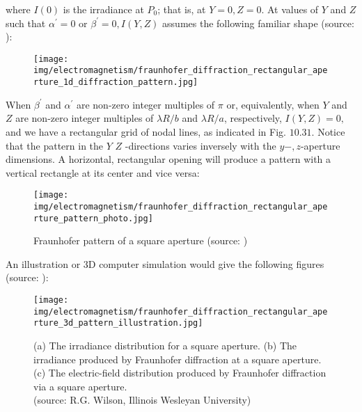 	where $I(0)$ is the irradiance at $P_{0}$; that is, at $Y=0, Z=0$. At values of $Y$ and $Z$ such that $\alpha^{\prime}=0$ or $\beta^{\prime}=0, I(Y, Z)$ assumes the following familiar shape (source: \cite{hecht2016optics}):
	\begin{figure}[H]
		\centering
		\texttt{[image: img/electromagnetism/fraunhofer\_diffraction\_rectangular\_aperture\_1d\_diffraction\_pattern.jpg]}
	\end{figure}
	When $\beta^{\prime}$ and $\alpha^{\prime}$ are non-zero integer multiples of $\pi$ or, equivalently, when $Y$ and $Z$ are non-zero integer multiples of $\lambda R / b$ and $\lambda R / a$, respectively, $I(Y, Z)=0,$ and we have a rectangular grid of nodal lines, as indicated in Fig. $10.31 .$ Notice that the pattern in the $Y$ $Z$ -directions varies inversely with the $y-, z$-aperture dimensions. A horizontal, rectangular opening will produce a pattern with a vertical rectangle at its center and vice versa:
	\begin{figure}[H]
		\centering
		\texttt{[image: img/electromagnetism/fraunhofer\_diffraction\_rectangular\_aperture\_pattern\_photo.jpg]}
		\caption[Fraunhofer pattern of a square aperture ]{Fraunhofer pattern of a square aperture (source: \cite{hecht2016optics})}
	\end{figure}
	An illustration or 3D computer simulation would give the following figures (source: \cite{hecht2016optics}):
	\begin{figure}[H]
		\centering
		\texttt{[image: img/electromagnetism/fraunhofer\_diffraction\_rectangular\_aperture\_3d\_pattern\_illustration.jpg]}
		\caption[]{(a) The irradiance distribution for a square aperture. (b) The irradiance produced by Fraunhofer diffraction at a square aperture. (c) The electric-field distribution produced by Fraunhofer diffraction via a square aperture.\\ (source: R.G. Wilson, Illinois Wesleyan University)}
	\end{figure}
	

